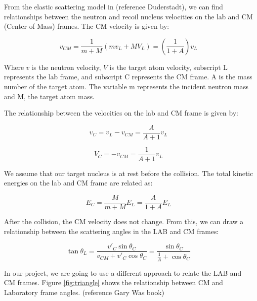 \documentclass[review]{elsarticle}
\begin{document}
From the elastic scattering model in (reference Duderstadt), we can find relationships between the neutron and recoil nucleus velocities on the lab and CM (Center of Mass) frames. The CM velocity is given by:

\begin{equation}
	v_{CM} = \frac{1}{m+M}(m v_L + M V_L) = \left( \frac{1}{1+A}\right) v_L
\end{equation}

Where $v$ is the neutron velocity, $V$ is the target atom velocity, subscript L represents the lab frame, and subscript C represents the CM frame. A is the mass number of the target atom. The variable m represents the incident neutron mass and M, the target atom mass. \par
The relationship between the velocities on the lab and CM frame is given by:

\begin{equation}
	v_C = v_L - v_{CM} = \frac{A}{A+1}v_L 
\end{equation}

\begin{equation}
	V_C = - v_{CM} = \frac{1}{A+1}v_L
\end{equation}

We assume that our target nucleus is at rest before the collision. The total kinetic energies on the lab and CM frame are related as: 

\begin{equation}
	E_C = \frac{M}{m+M}E_L = \frac{A}{1+A}E_L
\end{equation}

After the collision, the CM velocity does not change. From this, we can draw a relationship between the scattering angles in the LAB and CM frames:

\begin{equation}
	\tan \theta_L = \frac{{v'}_{C} \sin \theta_C }{{v}_{CM} + {v'}_{C} \cos \theta_C} = \frac{\sin \theta_C}{\frac{1}{A} + \cos \theta_C}
\end{equation}

In our project, we are going to use a different approach to relate the LAB and CM frames. Figure \ref{fig:triangle} shows the relationship between CM and Laboratory frame angles. (reference Gary Was book)
\end{document}
